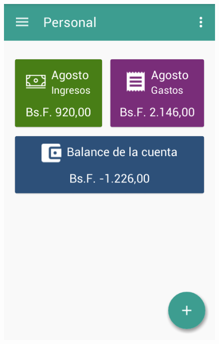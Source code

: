 \begin{figure}[ht]
\centering
\begin{minipage}{.5\textwidth}
  \centering
  \includegraphics[scale=0.4,type=png,ext=.png,read=.png]{imagenes/dashboard}
  \captionsetup{justification=centering}
  \label{fig:interfazDashboard}
\end{minipage}%
\begin{minipage}{.5\textwidth}
\centering

\end{minipage}
\end{figure}
